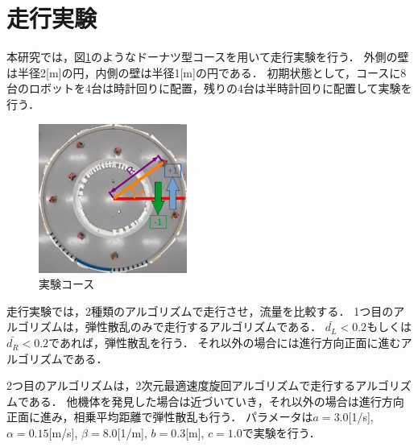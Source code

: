 \documentclass[twocolumn,dvipdfmx]{jarticle}
\begin{document}
\section{走行実験}
本研究では，図\ref{fig:cource}のようなドーナツ型コースを用いて走行実験を行う．
外側の壁は半径2[m]の円，内側の壁は半径1[m]の円である．
初期状態として，コースに8台のロボットを4台は時計回りに配置，残りの4台は半時計回りに配置して実験を行う．
\begin{figure}[ht]
\begin{center}
  \includegraphics[height=4.9cm,width=0.7\linewidth]{pic/cource3.png}
  \caption{実験コース}
  \label{fig:cource}
\end{center}
\end{figure}
走行実験では，2種類のアルゴリズムで走行させ，流量を比較する．
1つ目のアルゴリズムは，弾性散乱のみで走行するアルゴリズムである．
$\bar{d_{L}} < 0.2$もしくは$\bar{d_{R}} < 0.2$であれば，弾性散乱を行う．
それ以外の場合には進行方向正面に進むアルゴリズムである．

2つ目のアルゴリズムは，2次元最適速度旋回アルゴリズムで走行するアルゴリズムである．
他機体を発見した場合は近づいていき，それ以外の場合は進行方向正面に進み，相乗平均距離で弾性散乱も行う．
パラメータは$a=3.0$[1/s], $\alpha=0.15$[m/s], $\beta=8.0$[1/m], $b=0.3$[m], $c=1.0$で実験を行う．
\vspace{-2.5mm}
\end{document}
